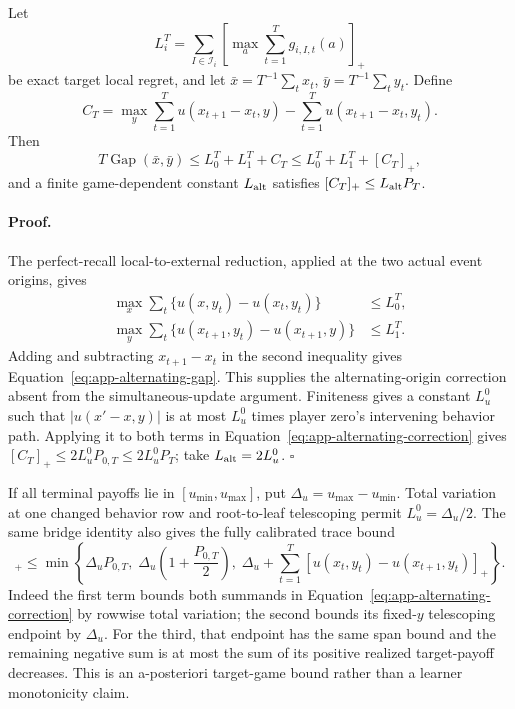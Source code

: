 \begin{lemma}
\label{lem:app-alternating-bridge}
Let
\begin{equation}
L_i^T=\sum_{I\in\mathcal I_i}
\left[\max_a\sum_{t=1}^T g_{i,I,t}(a)\right]_+
\end{equation}
be exact target local regret, and let
$\bar x=T^{-1}\sum_t x_t$, $\bar y=T^{-1}\sum_t y_t$.  Define
\begin{equation}
C_T=\max_{y}\sum_{t=1}^T u(x_{t+1}-x_t,y)
-\sum_{t=1}^T u(x_{t+1}-x_t,y_t).
\label{eq:app-alternating-correction}
\end{equation}
Then
\begin{equation}
T\operatorname{Gap}(\bar x,\bar y)
\le L_0^T+L_1^T+C_T
\le L_0^T+L_1^T+[C_T]_+,
\label{eq:app-alternating-gap}
\end{equation}
and a finite game-dependent constant $L_{\rm alt}$ satisfies
$[C_T]_+\le L_{\rm alt}P_T$.
\end{lemma}

\paragraph{Proof.}
The perfect-recall local-to-external reduction, applied at the two actual
event origins, gives
\begin{align}
\max_x\sum_t\{u(x,y_t)-u(x_t,y_t)\}&\le L_0^T,\\
\max_y\sum_t\{u(x_{t+1},y_t)-u(x_{t+1},y)\}&\le L_1^T.
\end{align}
Adding and subtracting $x_{t+1}-x_t$ in the second inequality gives
Equation~\ref{eq:app-alternating-gap}.  This supplies the alternating-origin
correction absent from the simultaneous-update argument.  Finiteness gives a constant $L_u^0$
such that $|u(x'-x,y)|$ is at most $L_u^0$ times player zero's intervening
behavior path.  Applying it to both terms in
Equation~\ref{eq:app-alternating-correction} gives
$[C_T]_+\le2L_u^0P_{0,T}\le2L_u^0P_T$; take
$L_{\rm alt}=2L_u^0$. \hfill$\square$

If all terminal payoffs lie in $[u_{\min},u_{\max}]$, put
$\Delta_u=u_{\max}-u_{\min}$.  Total variation at one changed behavior row
and root-to-leaf telescoping permit $L_u^0=\Delta_u/2$.  The same bridge
identity also gives the fully calibrated trace bound
\begin{equation}
[C_T]_+\le
\min\left\{
\Delta_uP_{0,T},\;
\Delta_u\left(1+\frac{P_{0,T}}2\right),\;
\Delta_u+\sum_{t=1}^T
 [u(x_t,y_t)-u(x_{t+1},y_t)]_+
\right\}.
\label{eq:app-calibrated-alternating-bridge}
\end{equation}
Indeed the first term bounds both summands in
Equation~\ref{eq:app-alternating-correction} by rowwise total variation; the
second bounds its fixed-$y$ telescoping endpoint by $\Delta_u$.  For the
third, that endpoint has the same span bound and the remaining negative sum
is at most the sum of its positive realized target-payoff decreases.  This is
an a-posteriori target-game bound rather than a learner monotonicity claim.


